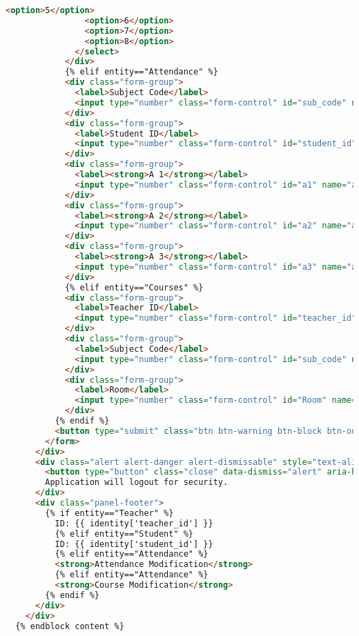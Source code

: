 \begin{lstlisting}[language=HTML]
                <option>5</option>
                <option>6</option>
                <option>7</option>
                <option>8</option>
              </select>
            </div>
            {% elif entity=="Attendance" %}
            <div class="form-group">
              <label>Subject Code</label>
              <input type="number" class="form-control" id="sub_code" name="sub_code" value={{identity.sub_code}}>
            </div>
            <div class="form-group">
              <label>Student ID</label>
              <input type="number" class="form-control" id="student_id" name="student_id" value={{identity.student_id}}>
            </div>
            <div class="form-group">
              <label><strong>A 1</strong></label>
              <input type="number" class="form-control" id="a1" name="a1" value={{identity.a1}}>
            </div>
            <div class="form-group">
              <label><strong>A 2</strong></label>
              <input type="number" class="form-control" id="a2" name="a2" value={{identity.a2}}>
            </div>
            <div class="form-group">
              <label><strong>A 3</strong></label>
              <input type="number" class="form-control" id="a3" name="a3" value={{identity.a3}}>
            </div>
            {% elif entity=="Courses" %}
            <div class="form-group">
              <label>Teacher ID</label>
              <input type="number" class="form-control" id="teacher_id" name="teacher_id" value={{identity.teacher_id}}>
            </div>
            <div class="form-group">
              <label>Subject Code</label>
              <input type="number" class="form-control" id="sub_code" name="sub_code" value={{identity.sub_code}}>
            </div>
            <div class="form-group">
              <label>Room</label>
              <input type="number" class="form-control" id="Room" name="Room" value={{identity.Room}}>
            </div>
          {% endif %}
          <button type="submit" class="btn btn-warning btn-block btn-outline" value="Submit">Submit</button>
        </form>
      </div>
      <div class="alert alert-danger alert-dismissable" style="text-align: center;">
        <button type="button" class="close" data-dismiss="alert" aria-hidden="true">x</button>
        Application will logout for security.
      </div>
      <div class="panel-footer">
        {% if entity=="Teacher" %}
          ID: {{ identity['teacher_id'] }}
          {% elif entity=="Student" %}
          ID: {{ identity['student_id'] }}
          {% elif entity=="Attendance" %}
          <strong>Attendance Modification</strong>
          {% elif entity=="Attendance" %}
          <strong>Course Modification</strong>
        {% endif %}
      </div>
    </div>
  {% endblock content %}
\end{lstlisting}
\pagebreak

